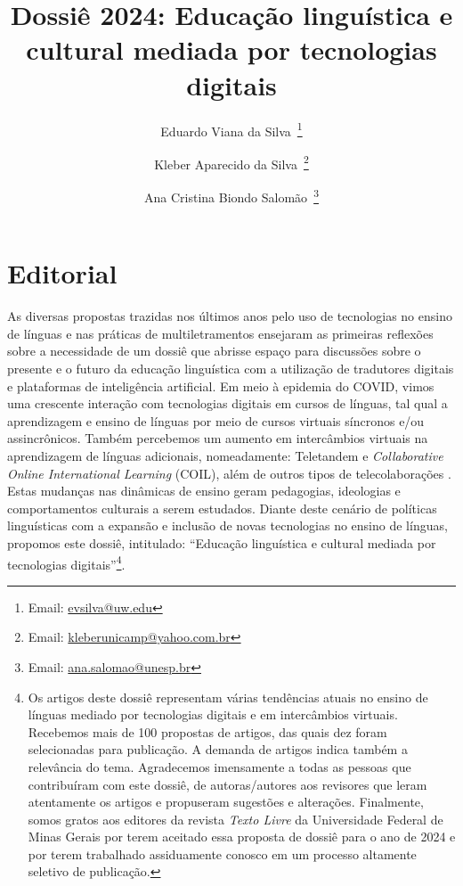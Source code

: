 \documentclass[portuguese]{textolivre}
\title{Dossiê 2024: Educação linguística e cultural mediada por tecnologias digitais}
\author[1]{Eduardo Viana da Silva~\orcid{0000-0002-3651-3524}\thanks{Email: \href{mailto:evsilva@uw.edu}{evsilva@uw.edu}}}
\author[2]{Kleber Aparecido da Silva~\orcid{0000-0002-7815-7767}\thanks{Email: \href{mailto:kleberunicamp@yahoo.com.br}{kleberunicamp@yahoo.com.br}}}
\author[3]{Ana Cristina Biondo Salomão~\orcid{0000-0002-1531-8551}\thanks{Email: \href{mailto:ana.salomao@unesp.br}{ana.salomao@unesp.br}}}
\affil[1]{University of Washington, Seattle, EUA.}
\affil[2]{Universidade de Brasília, Brasília, DF, Brasil.}
\affil[3]{Universidade Estadual Paulista ``Júlio de Mesquita Filho'', FCL, Araraquara, SP, Brasil.}
\begin{document}
\maketitle

\section{Editorial}
As diversas propostas trazidas nos últimos anos pelo uso de tecnologias no ensino de línguas e nas práticas de multiletramentos ensejaram as primeiras reflexões sobre a necessidade de um dossiê que abrisse espaço para discussões sobre o presente e o futuro da educação linguística com a utilização de tradutores digitais e plataformas de inteligência artificial. Em meio à epidemia do COVID, vimos uma crescente interação com tecnologias digitais em cursos de línguas, tal qual a aprendizagem e ensino de línguas por meio de cursos virtuais síncronos e/ou assincrônicos. Também percebemos um aumento em intercâmbios virtuais na aprendizagem de línguas adicionais, nomeadamente: Teletandem e \textit{Collaborative Online International Learning} (COIL), além de outros tipos de telecolaborações \cite{salomao2020,salomao2023}. Estas mudanças nas dinâmicas de ensino geram pedagogias, ideologias e comportamentos culturais a serem estudados. Diante deste cenário de políticas linguísticas com a expansão e inclusão de novas tecnologias no ensino de línguas, propomos este dossiê, intitulado: “Educação linguística e cultural mediada por tecnologias digitais”\footnote{Os artigos deste dossiê representam várias tendências atuais no ensino de línguas mediado por tecnologias digitais e em intercâmbios virtuais. Recebemos mais de 100 propostas de artigos, das quais dez foram selecionadas para publicação. A demanda de artigos indica também a relevância do tema. Agradecemos imensamente a todas as pessoas que contribuíram com este dossiê, de autoras/autores aos revisores que leram atentamente os artigos e propuseram sugestões e alterações. Finalmente, somos gratos aos editores da revista \textit{Texto Livre} da Universidade Federal de Minas Gerais por terem aceitado essa proposta de dossiê para o ano de 2024 e por terem trabalhado assiduamente conosco em um processo altamente seletivo de publicação.}.
\end{document}
